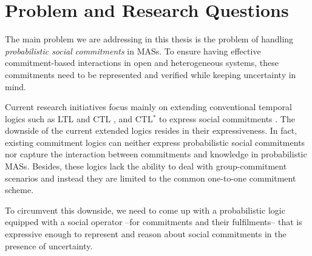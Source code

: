 


\section{Problem and Research Questions} \label{sec:problem statement-chap1}

The main problem we are addressing in this thesis is the problem of handling \textit{probabilistic social commitments} in MASs. To ensure having effective commitment-based interactions in open and heterogeneous systems, these commitments need to be represented and verified while keeping uncertainty in mind.

Current research initiatives focus mainly on extending conventional temporal logics such as LTL \cite{Pnueli1977} and CTL \cite{Emerson1990}, and CTL$^*$ \cite{Emerson1986} to express social commitments \cite{Baldoni2010,Bentahar2012,El-Menshawy2013a,Giordano2007,Pham2007,Verdicchio2003}. The downside of the current extended logics resides in their expressiveness. In fact, existing commitment logics can neither express probabilistic social commitments nor capture the interaction between commitments and knowledge in probabilistic MASs. Besides, these logics lack the ability to deal with group-commitment scenarios and instead they are limited to the common one-to-one commitment scheme.

To circumvent this downside, we need to come up with a probabilistic logic equipped with a social operator --for commitments and their fulfilments-- that is expressive enough to represent and reason about social commitments in the presence of uncertainty.


